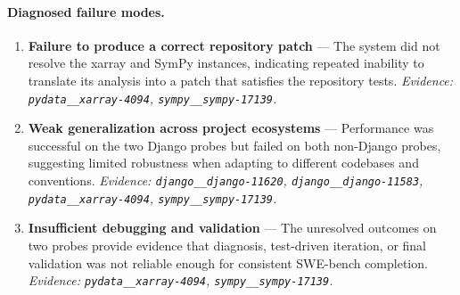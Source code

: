 \paragraph{Diagnosed failure modes.}\begin{enumerate}\itemsep1pt
\item \textbf{Failure to produce a correct repository patch} --- The system did not resolve the xarray and SymPy instances, indicating repeated inability to translate its analysis into a patch that satisfies the repository tests. \emph{Evidence: \texttt{pydata\_\_xarray-4094}, \texttt{sympy\_\_sympy-17139}.}
\item \textbf{Weak generalization across project ecosystems} --- Performance was successful on the two Django probes but failed on both non-Django probes, suggesting limited robustness when adapting to different codebases and conventions. \emph{Evidence: \texttt{django\_\_django-11620}, \texttt{django\_\_django-11583}, \texttt{pydata\_\_xarray-4094}, \texttt{sympy\_\_sympy-17139}.}
\item \textbf{Insufficient debugging and validation} --- The unresolved outcomes on two probes provide evidence that diagnosis, test-driven iteration, or final validation was not reliable enough for consistent SWE-bench completion. \emph{Evidence: \texttt{pydata\_\_xarray-4094}, \texttt{sympy\_\_sympy-17139}.}
\end{enumerate}
